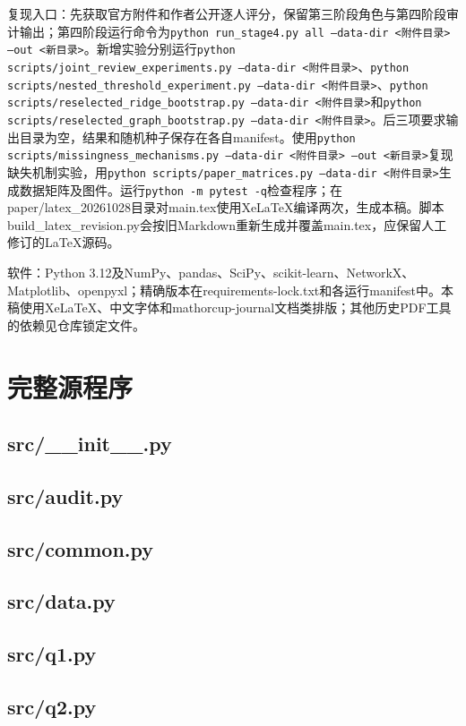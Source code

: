 \documentclass{mathorcup-journal}
\begin{document}
复现入口：先获取官方附件和作者公开逐人评分，保留第三阶段角色与第四阶段审计输出；第四阶段运行命令为\texttt{python run\_stage4.py all --data-dir <附件目录> --out <新目录>}。新增实验分别运行\texttt{python scripts/joint\_review\_experiments.py --data-dir <附件目录>}、\texttt{python scripts/nested\_threshold\_experiment.py --data-dir <附件目录>}、\texttt{python scripts/reselected\_ridge\_bootstrap.py --data-dir <附件目录>}和\texttt{python scripts/reselected\_graph\_bootstrap.py --data-dir <附件目录>}。后三项要求输出目录为空，结果和随机种子保存在各自manifest。使用\texttt{python scripts/missingness\_mechanisms.py --data-dir <附件目录> --out <新目录>}复现缺失机制实验，用\texttt{python scripts/paper\_matrices.py --data-dir <附件目录>}生成数据矩阵及图件。运行\texttt{python -m pytest -q}检查程序；在paper/latex\_20261028目录对main.tex使用XeLaTeX编译两次，生成本稿。脚本build\_latex\_revision.py会按旧Markdown重新生成并覆盖main.tex，应保留人工修订的LaTeX源码。


软件：Python 3.12及NumPy、pandas、SciPy、scikit-learn、NetworkX、Matplotlib、openpyxl；精确版本在requirements-lock.txt和各运行manifest中。本稿使用XeLaTeX、中文字体和mathorcup-journal文档类排版；其他历史PDF工具的依赖见仓库锁定文件。


\section{完整源程序}
\subsection*{src/\_\_init\_\_.py}

\subsection*{src/audit.py}

\subsection*{src/common.py}

\subsection*{src/data.py}

\subsection*{src/q1.py}

\subsection*{src/q2.py}

\end{document}
